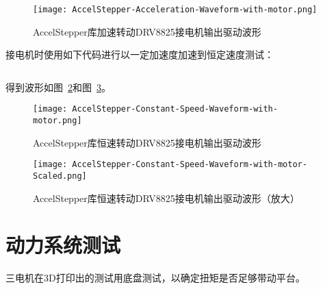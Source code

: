 \begin{figure}[htbp]
    \centering
    \texttt{[image: AccelStepper-Acceleration-Waveform-with-motor.png]}
    \caption{AccelStepper库加速转动DRV8825接电机输出驱动波形}
    \label{fig:AccelStepper-Acceleration-Waveform-with-motor}
\end{figure}

接电机时使用如下代码进行以一定加速度加速到恒定速度测试：

\inputminted[mathescape, linenos, breaklines]{C}{Code/Stepper-3/Stepper-3.ino}

得到波形如图~\ref{fig:AccelStepper-Constant-Speed-Waveform-with-motor}和图~\ref{fig:AccelStepper-Constant-Speed-Waveform-with-motor-Scaled}。

\begin{figure}[htbp]
    \centering
    \texttt{[image: AccelStepper-Constant-Speed-Waveform-with-motor.png]}
    \caption{AccelStepper库恒速转动DRV8825接电机输出驱动波形}
    \label{fig:AccelStepper-Constant-Speed-Waveform-with-motor}
\end{figure}

\begin{figure}[htbp]
    \centering
    \texttt{[image: AccelStepper-Constant-Speed-Waveform-with-motor-Scaled.png]}
    \caption{AccelStepper库恒速转动DRV8825接电机输出驱动波形（放大）}
    \label{fig:AccelStepper-Constant-Speed-Waveform-with-motor-Scaled}
\end{figure}

\section{动力系统测试}

三电机在3D打印出的测试用底盘测试，以确定扭矩是否足够带动平台。